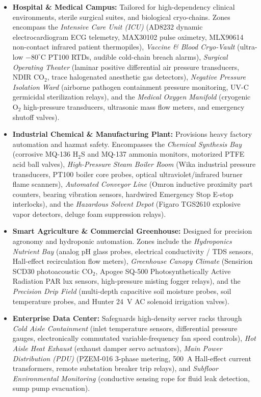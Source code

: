 \documentclass[12pt,a4paper]{article}
\begin{document}
\begin{enumerate}
\begin{itemize}
        \item \textbf{Hospital \& Medical Campus:} Tailored for high-dependency clinical environments, sterile surgical suites, and biological cryo-chains. Zones encompass the \textit{Intensive Care Unit (ICU)} (AD8232 dynamic electrocardiogram ECG telemetry, MAX30102 pulse oximetry, MLX90614 non-contact infrared patient thermopiles), \textit{Vaccine \& Blood Cryo-Vault} (ultra-low $-80^\circ$C PT100 RTDs, audible cold-chain breach alarms), \textit{Surgical Operating Theater} (laminar positive differential air pressure transducers, NDIR CO$_2$, trace halogenated anesthetic gas detectors), \textit{Negative Pressure Isolation Ward} (airborne pathogen containment pressure monitoring, UV-C germicidal sterilization relays), and the \textit{Medical Oxygen Manifold} (cryogenic O$_2$ high-pressure transducers, ultrasonic mass flow meters, and emergency shutoff valves).
        
        \item \textbf{Industrial Chemical \& Manufacturing Plant:} Provisions heavy factory automation and hazmat safety. Encompasses the \textit{Chemical Synthesis Bay} (corrosive MQ-136 H$_2$S and MQ-137 ammonia monitors, motorized PTFE acid ball valves), \textit{High-Pressure Steam Boiler Room} (Wika industrial pressure transducers, PT100 boiler core probes, optical ultraviolet/infrared burner flame scanners), \textit{Automated Conveyor Line} (Omron inductive proximity part counters, bearing vibration sensors, hardwired Emergency Stop E-stop interlocks), and the \textit{Hazardous Solvent Depot} (Figaro TGS2610 explosive vapor detectors, deluge foam suppression relays).
        
        \item \textbf{Smart Agriculture \& Commercial Greenhouse:} Designed for precision agronomy and hydroponic automation. Zones include the \textit{Hydroponics Nutrient Bay} (analog pH glass probes, electrical conductivity / TDS sensors, Hall-effect recirculation flow meters), \textit{Greenhouse Canopy Climate} (Sensirion SCD30 photoacoustic CO$_2$, Apogee SQ-500 Photosynthetically Active Radiation PAR lux sensors, high-pressure misting fogger relays), and the \textit{Precision Drip Field} (multi-depth capacitive soil moisture probes, soil temperature probes, and Hunter 24~V AC solenoid irrigation valves).
        
        \item \textbf{Enterprise Data Center:} Safeguards high-density server racks through \textit{Cold Aisle Containment} (inlet temperature sensors, differential pressure gauges, electronically commutated variable-frequency fan speed controls), \textit{Hot Aisle Heat Exhaust} (exhaust damper servo actuators), \textit{Main Power Distribution (PDU)} (PZEM-016 3-phase metering, 500~A Hall-effect current transformers, remote substation breaker trip relays), and \textit{Subfloor Environmental Monitoring} (conductive sensing rope for fluid leak detection, sump pump evacuation).
    \end{itemize}
    

\end{enumerate}
\end{document}
